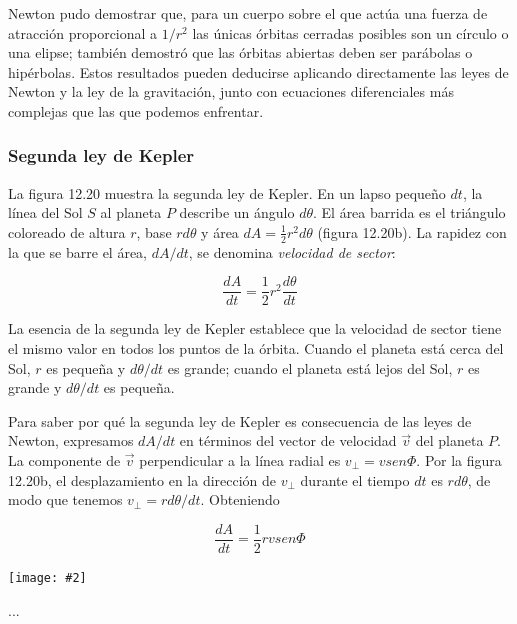 \documentclass{article}
\newcommand{\newtitle}[1]{
    \color{titleColor}
    \subsubsection{#1}
    \color{black}
}
\newcommand{\ladoALado}[4]{
    \begin{minipage}[t]{#3\textwidth}
        \vspace{0pt}
        #1
    \end{minipage}
    \hfill
    \begin{minipage}[t]{#4\textwidth}
        \vspace{0pt}
        \centering
        \texttt{[image: \#2]}
    \end{minipage}
}
\begin{document}
    \vspace{0.4cm}

    \par Newton pudo demostrar que, para un cuerpo sobre el que actúa una fuerza de atracción proporcional a $1/r^2$ las únicas órbitas cerradas posibles son un círculo o una elipse; también demostró que las órbitas abiertas deben ser parábolas o hipérbolas. Estos resultados pueden deducirse aplicando directamente las leyes de Newton y la ley de la gravitación, junto con ecuaciones diferenciales más complejas que las que podemos enfrentar.

    \newtitle{Segunda ley de Kepler}

    \ladoALado{
        \par La ﬁgura 12.20 muestra la segunda ley de Kepler. En un lapso pequeño $dt$, la línea del Sol $S$ al planeta $P$ describe un ángulo $d \theta$. El área barrida es el triángulo coloreado de altura $r$, base $r d \theta$ y área $dA = \frac{1}{2} r^2 d \theta$ (ﬁgura 12.20b). La rapidez con la que se barre el área, $dA/dt$, se denomina \textit{velocidad de sector}:

        \[ \frac{dA}{dt} = \frac{1}{2} r^2 \frac{d \theta}{dt} \]

        \par La esencia de la segunda ley de Kepler establece que la velocidad de sector tiene el mismo valor en todos los puntos de la órbita. Cuando el planeta está cerca del Sol, $r$ es pequeña y $d\theta/dt$ es grande; cuando el planeta está lejos del Sol, $r$ es grande y $d\theta/dt$ es pequeña.

        \vspace{0.4cm}

        \par Para saber por qué la segunda ley de Kepler es consecuencia de las leyes de Newton, expresamos $dA/dt$ en términos del vector de velocidad $\vec{v}$ del planeta $P$. La componente de $\vec{v}$ perpendicular a la línea radial es $v_{\perp} = v sen \Phi$. Por la ﬁgura 12.20b, el desplazamiento en la dirección de $v_{\perp}$ durante el tiempo $dt$ es $r d \theta$, de modo que tenemos $v_{\perp} = r d\theta/dt$. Obteniendo

        \[ \frac{dA}{dt} = \frac{1}{2} r v sen \Phi\]
        

    }{img/11.5-2.png}{0.6}{0.4}
    
        \par ... %
\end{document}
